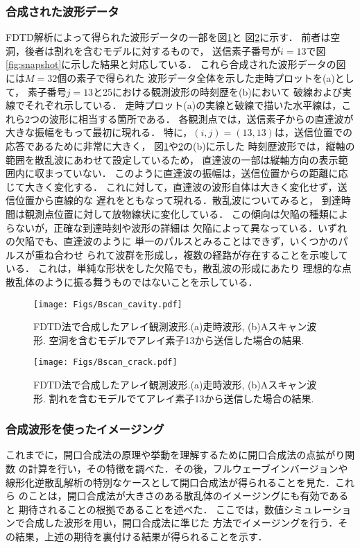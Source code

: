 \subsubsection{合成された波形データ}
FDTD解析によって得られた波形データの一部を図\ref{fig:bscan_cavity}と
図\ref{fig:bscan_crack}に示す．
前者は空洞，後者は割れを含むモデルに対するもので，
送信素子番号が$i=13$で図\ref{fig:snapshot}に示した結果と対応している．
これら合成された波形データの図には$M=32$個の素子で得られた
波形データ全体を示した走時プロットを(a)として，
素子番号$j=13$と25における観測波形の時刻歴を(b)において
破線および実線でそれぞれ示している．
走時プロット(a)の実線と破線で描いた水平線は，これら2つの波形に相当する箇所である．
各観測点では，送信素子からの直達波が大きな振幅をもって最初に現れる．
特に，$(i,j)=(13,13)$は，送信位置での応答であるために非常に大きく，
図\ref{fig:bscan_cavity}や\ref{fig:bscan_crack}の(b)に示した
時刻歴波形では，縦軸の範囲を散乱波にあわせて設定しているため，
直達波の一部は縦軸方向の表示範囲内に収まっていない．
このように直達波の振幅は，送信位置からの距離に応じて大きく変化する．
これに対して，直達波の波形自体は大きく変化せず，送信位置から直線的な
遅れをともなって現れる．散乱波についてみると，
到達時間は観測点位置に対して放物線状に変化している．
この傾向は欠陥の種類によらないが，正確な到達時刻や波形の詳細は
欠陥によって異なっている．いずれの欠陥でも、直達波のように
単一のパルスとみることはできず，いくつかのパルスが重ね合わせ
られて波群を形成し，複数の経路が存在することを示唆している．
これは，単純な形状をした欠陥でも，散乱波の形成にあたり
理想的な点散乱体のように振る舞うものではないことを示している．
%
\begin{figure}[h]
	\begin{center}
	\texttt{[image: Figs/Bscan\_cavity.pdf]} 
	\end{center}
	\caption{FDTD法で合成したアレイ観測波形.(a)走時波形, (b)Aスキャン波形. 
	空洞を含むモデルでアレイ素子13から送信した場合の結果.} 
	\label{fig:bscan_cavity}
\end{figure}
\begin{figure}[h]
	\begin{center}
	\texttt{[image: Figs/Bscan\_crack.pdf]} 
	\end{center}
	\caption{FDTD法で合成したアレイ観測波形.(a)走時波形, (b)Aスキャン波形. 
	割れを含むモデルでてアレイ素子13から送信した場合の結果.} 
	\label{fig:bscan_crack}
\end{figure}
\subsubsection{合成波形を使ったイメージング}
これまでに，開口合成法の原理や挙動を理解するために開口合成法の点拡がり関数
の計算を行い，その特徴を調べた．その後，フルウェーブインバージョンや
線形化逆散乱解析の特別なケースとして開口合成法が得られることを見た．これら
のことは，開口合成法が大きさのある散乱体のイメージングにも有効であると
期待されることの根拠であることを述べた．
ここでは，数値シミュレーションで合成した波形を用い，開口合成法に準じた
方法でイメージングを行う．その結果，上述の期待を裏付ける結果が得られることを示す．

